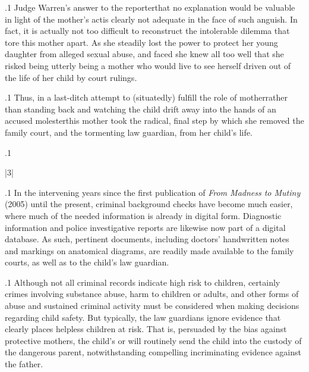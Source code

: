 \documentclass[11pt, twoside]{article}
\begin{document}
{{}%

\p.1{%
Judge Warren’s answer to the reporter\mdash{}that no explanation would be
valuable in light of the mother’s  act\mdash{}is clearly not adequate
in the face of such anguish. In fact, it is actually not too difficult to reconstruct the intolerable dilemma that tore this mother apart. As she
steadily lost the power to protect her young daughter from alleged sexual abuse, and faced  she knew all too well
that she risked being utterly \mdash{}being a mother who would
live to see herself driven out of the life of her child by court rulings.
}%

\p.1{%
Thus, in a last-ditch attempt to (situatedly) fulfill the role of
mother\mdash{}rather than standing back and watching the child drift away into the
hands of an accused molester\mdash{}this mother took the radical, final step by
which she removed the family court, and the tormenting law guardian,
from her child’s life.
}%

\p.1{%
\writeAddendum{}
}%


\s|3|{ }

\p.1{%
\noindent{}In the intervening years since the first publication of \textit{From Madness to
Mutiny} (2005) until the present, criminal background checks have become much easier, where much of the needed information is already in
digital form. Diagnostic information and police investigative reports are
likewise now part of a digital database. As such, pertinent documents,
including doctors’ handwritten notes and markings on anatomical diagrams, are readily made available to the family courts, as well as to the
child’s law guardian.
}%

\p.1{%
Although not all criminal records indicate high risk to children, certainly crimes involving substance abuse, harm to children or adults, and
other forms of abuse and sustained criminal activity must be considered when making decisions regarding child safety. But typically, the
law guardians ignore evidence that clearly places helpless children at
risk. That is, persuaded by the bias against protective mothers, the child’s
 or  will routinely send the child into the custody
of the dangerous parent, notwithstanding compelling incriminating
evidence against the father.
}%

}
\end{document}
